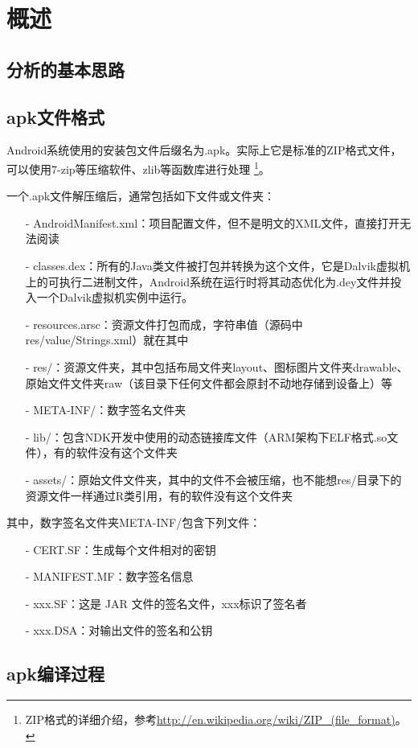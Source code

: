 \chapter{概述}
\section{分析的基本思路}
\section{apk文件格式}
Android系统使用的安装包文件后缀名为.apk。实际上它是标准的ZIP格式文件，可以使用7-zip等压缩软件、zlib等函数库进行处理
\footnote{ZIP格式的详细介绍，参考\url{http://en.wikipedia.org/wiki/ZIP\_(file\_format)}。}。

一个.apk文件解压缩后，通常包括如下文件或文件夹：
\begin{itemize}
	\item[-] AndroidManifest.xml：项目配置文件，但不是明文的XML文件，直接打开无法阅读
	\item[-] classes.dex：所有的Java类文件被打包并转换为这个文件，它是Dalvik虚拟机上的可执行二进制文件，Android系统在运行时将其动态优化为.dey文件并投入一个Dalvik虚拟机实例中运行。
	\item[-] resources.arsc：资源文件打包而成，字符串值（源码中res/value/Strings.xml）就在其中
	\item[-] res/：资源文件夹，其中包括布局文件夹layout、图标图片文件夹drawable、原始文件文件夹raw（该目录下任何文件都会原封不动地存储到设备上）等
	\item[-] META-INF/：数字签名文件夹
	\item[-] lib/：包含NDK开发中使用的动态链接库文件（ARM架构下ELF格式.so文件），有的软件没有这个文件夹
	\item[-] assets/：原始文件文件夹，其中的文件不会被压缩，也不能想res/目录下的资源文件一样通过R类引用，有的软件没有这个文件夹
\end{itemize}
其中，数字签名文件夹META-INF/包含下列文件：
\begin{itemize}
	\item[-] CERT.SF：生成每个文件相对的密钥
	\item[-] MANIFEST.MF：数字签名信息
	\item[-] xxx.SF：这是 JAR 文件的签名文件，xxx标识了签名者
	\item[-] xxx.DSA：对输出文件的签名和公钥
\end{itemize}

\section{apk编译过程}
